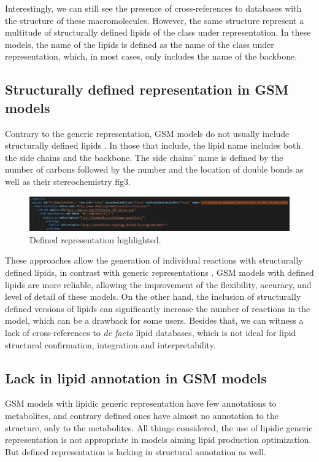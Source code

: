 \documentclass{llncs}
\begin{document}
Interestingly, we can still see the presence of cross-references to databases with the structure of these macromolecules. However, the same structure represent a multitude of structurally defined lipids of the class under representation. In these models, the name of the lipids is defined as the name of the class under representation, which, in most cases, only includes the name of the backbone.

\subsection{Structurally defined representation in GSM models}
Contrary to the generic representation, GSM models do not usually include structurally defined lipids \cite{Schutzhold}.
In those that include, the lipid name includes both the side chains and the backbone. The side chains' name is defined by the number of carbons followed by the number and the location of double bonds as well as their stereochemistry fig3.

\begin{figure}
    \includegraphics[width=\textwidth]{imagens/defenido.png}
    \caption{Defined representation highlighted.} \label{fig3}
\end{figure}

These approaches allow the generation of individual reactions with structurally defined lipids, in contrast with generic representations \cite{Aung2013}.
GSM models with defined lipids are more reliable, allowing the improvement of the flexibility, accuracy, and level of detail of these models. On the other hand, the inclusion of structurally defined versions of lipids can significantly increase the number of reactions in the model, which can be a drawback for some users.
Besides that, we can witness a lack of cross-references to \textit{de facto} lipid databases, which is not ideal for lipid structural confirmation, integration and interpretability.

\subsection{Lack in lipid annotation in GSM models}
 
GSM models with lipidic generic representation have few annotations to metabolites, and contrary defined ones have almost no annotation to the structure, only to the metabolites.
All things considered, the use of lipidic generic representation is not appropriate in models aiming lipid production optimization. 
But defined representation is lacking in structural annotation as well.
\end{document}

